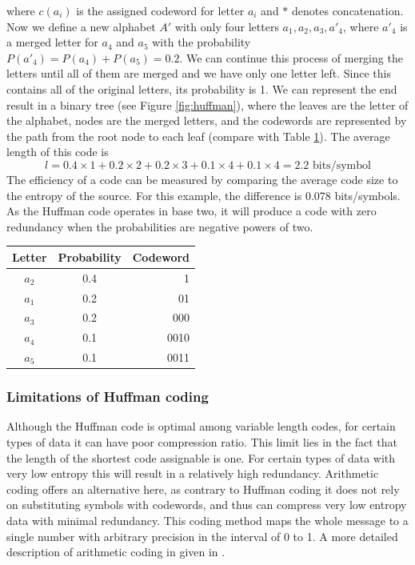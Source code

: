       where $c(a_i)$ is the assigned codeword for letter $a_i$ and $*$ denotes concatenation. Now we define a new alphabet $A'$ with only four letters $a_1, a_2, a_3, a'_4$, where $a'_4$ is a merged letter for $a_4$ and $a_5$ with the probability $P(a'_4) = P(a_4) + P(a_5) = 0.2$. We can continue this process of merging the letters until all of them are merged and we have only one letter left. Since this contains all of the original letters, its probability is 1. We can represent the end result in a binary tree (see Figure \ref{fig:huffman}), where the leaves are the letter of the alphabet, nodes are the merged letters, and the codewords are represented by the path from the root node to each leaf (compare with Table \ref{tab:huffman2}). The average length of this code is
      \begin{equation}
        l = 0.4\times 1 + 0.2 \times 2 + 0.2 \times 3 + 0.1 \times 4 + 0.1 \times 4 = 2.2 \text{ bits/symbol}
      \end{equation}
      The efficiency of a code can be measured by comparing the average code size to the entropy of the source. For this example, the difference is 0.078 bits/symbols. As the Huffman code operates in base two, it will produce a code with zero redundancy when the probabilities are negative powers of two.
  
      \begin{table}
        \centering
        \begin{tabular}{ccr}
          \toprule
          Letter & Probability & Codeword \\
          \midrule
          $a_2$ & 0.4 & 1 \\
          $a_1$ & 0.2 & 01 \\
          $a_3$ & 0.2 & 000 \\
          $a_4$ & 0.1 & 0010 \\
          $a_5$ & 0.1 & 0011 \\
          \bottomrule
        \end{tabular}
        \label{tab:huffman2}
      \end{table}

    \subsubsection{Limitations of Huffman coding}
      Although the Huffman code is optimal among variable length codes, for certain types of data it can have poor compression ratio. This limit lies in the fact that the length of the shortest code assignable is one. For certain types of data with very low entropy this will result in a relatively high redundancy. Arithmetic coding offers an alternative here, as contrary to Huffman coding it does not rely on substituting symbols with codewords, and thus can compress very low entropy data with minimal redundancy. This coding method maps the whole message to a single number with arbitrary precision in the interval of 0 to 1. A more detailed description of arithmetic coding in given in \cite{sayood_introduction_2012}.

